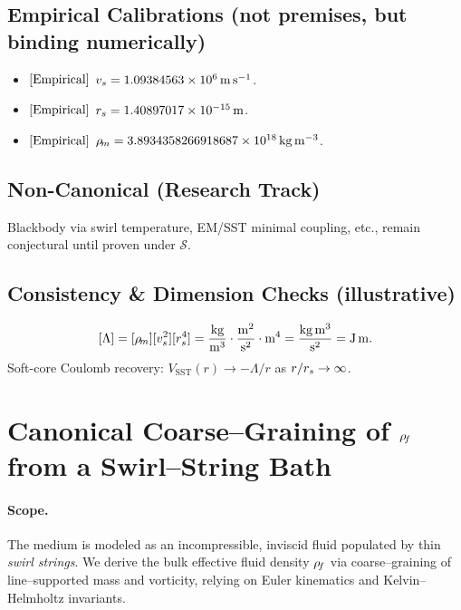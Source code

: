 \documentclass[11pt]{article}
\begin{document}
    \subsection*{Empirical Calibrations (not premises, but binding numerically)}
    \begin{itemize}
        \item \([{\rm Empirical}]\) \(v_s = 1.09384563\times 10^6\,\mathrm{m\,s^{-1}}\).
        \item \([{\rm Empirical}]\) \(r_s = 1.40897017\times 10^{-15}\,\mathrm{m}\).
        \item \([{\rm Empirical}]\) \(\rho_{\!m} = 3.8934358266918687\times 10^{18}\,\mathrm{kg\,m^{-3}}\).
    \end{itemize}

    \subsection*{Non-Canonical (Research Track)}
    Blackbody via swirl temperature, EM/SST minimal coupling, etc., remain conjectural until proven under \(\mathcal{S}\).

    \subsection*{Consistency \& Dimension Checks (illustrative)}
    \[
        [\Lambda]=[\rho_{\!m}][v_s^2][r_s^4]
        =\frac{\mathrm{kg}}{\mathrm{m^3}}\cdot\frac{\mathrm{m^2}}{\mathrm{s^2}}\cdot\mathrm{m^4}
        =\frac{\mathrm{kg\,m^3}}{\mathrm{s^2}}
        =\mathrm{J\,m}.
    \]
    Soft-core Coulomb recovery: \(V_{\text{SST}}(r)\to -\Lambda/r\) as \(r/r_s\to\infty\).



    \section{Canonical Coarse–Graining of \(\rho_{\!f}\) from a Swirl–String Bath}
    \label{sec:canon_rhof_from_strings}

    \paragraph{Scope.}
    The medium is modeled as an incompressible, inviscid fluid populated by thin \emph{swirl strings}. We derive the bulk effective fluid density \(\rho_{\!f}\) via coarse–graining of line–supported mass and vorticity, relying on Euler kinematics and Kelvin–Helmholtz invariants.
\end{document}
